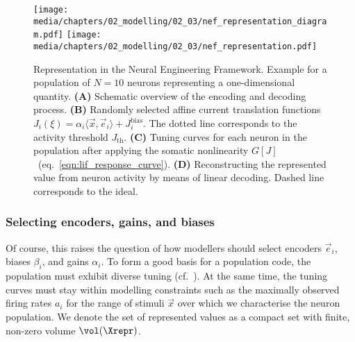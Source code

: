 \begin{figure}
	\centering
	\hspace{-0.2cm}\texttt{[image: media/chapters/02\_modelling/02\_03/nef\_representation\_diagram.pdf]}
	\texttt{[image: media/chapters/02\_modelling/02\_03/nef\_representation.pdf]}
	{\label{fig:nef_representation_diagram}}
	{\label{fig:nef_representation_current_translation}}
	{\label{fig:nef_representation_tuning_curves}}
	{\label{fig:nef_representation_deocding}}
	\caption[Representation in the Neural Engineering Framework]{Representation in the Neural Engineering Framework. Example for a population of $N = 10$ neurons representing a one-dimensional quantity.
	\textbf{(A)} Schematic overview of the encoding and decoding process.
	\textbf{(B)} Randomly selected affine current translation functions $J_i(\xi) = \alpha_i \langle \vec x, \vec e_i \rangle + J^\mathrm{bias}_i$. The dotted line corresponds to the activity threshold $J_\mathrm{th}$.
	\textbf{(C)} Tuning curves for each neuron in the population after applying the somatic nonlinearity $G[J]$~(eq.~\ref{eqn:lif_response_curve}).
	\textbf{(D)} Reconstructing the represented value from neuron activity by means of linear decoding. Dashed line corresponds to the ideal.}
	\label{fig:nef_representation}
\end{figure}

\subsubsection{Selecting encoders, gains, and biases}
Of course, this raises the question of how modellers should select encoders $\vec e_i$, biases $\beta_i$, and gains $\alpha_i$.
To form a good basis for a population code, the population must exhibit diverse tuning (cf.~).
At the same time, the tuning curves must stay within modelling constraints such as the maximally observed firing rates $a_i$ for the range of stimuli $\vec x$ over which we characterise the neuron population.
We denote the set of represented values as a compact set \Xrepr with finite, non-zero volume $\vol(\Xrepr)$.


